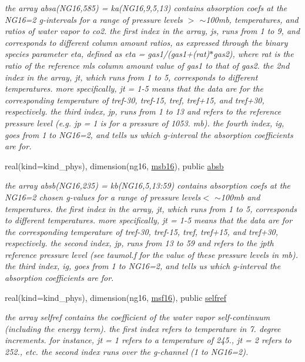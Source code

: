 \begin{Indent}
\begin{DoxyCompactItemize}
\begin{DoxyCompactList}\small\item\em the array absa(\+N\+G16,585) = ka(\+N\+G16,9,5,13) contains absorption coefs at the N\+G16=2 g-\/intervals for a range of pressure levels $>$ $\sim$100mb, temperatures, and ratios of water vapor to co2. the first index in the array, js, runs from 1 to 9, and corresponds to different column amount ratios, as expressed through the binary species parameter eta, defined as eta = gas1/(gas1+(rat)$\ast$gas2), where rat is the ratio of the reference mls column amount value of gas1 to that of gas2. the 2nd index in the array, jt, which runs from 1 to 5, corresponds to different temperatures. more specifically, jt = 1-\/5 means that the data are for the corresponding temperature of tref-\/30, tref-\/15, tref, tref+15, and tref+30, respectively. the third index, jp, runs from 1 to 13 and refers to the reference pressure level (e.\+g. jp = 1 is for a pressure of 1053. mb). the fourth index, ig, goes from 1 to N\+G16=2, and tells us which g-\/interval the absorption coefficients are for. \end{DoxyCompactList}\item 
real(kind=kind\+\_\+phys), dimension(ng16, \hyperlink{group__module__radlw__kgbnn_ga18ad5b461d6c71b1aa2d82d5694beb03}{msb16}), public \hyperlink{group__module__radlw__kgbnn_gae856b42252b71d4d588ea5e19e871cac}{absb}
\begin{DoxyCompactList}\small\item\em the array absb(\+N\+G16,235) = kb(\+N\+G16,5,13\+:59) contains absorption coefs at the N\+G16=2 chosen g-\/values for a range of pressure levels$<$ $\sim$100mb and temperatures. the first index in the array, jt, which runs from 1 to 5, corresponds to different temperatures. more specifically, jt = 1-\/5 means that the data are for the corresponding temperature of tref-\/30, tref-\/15, tref, tref+15, and tref+30, respectively. the second index, jp, runs from 13 to 59 and refers to the jpth reference pressure level (see taumol.\+f for the value of these pressure levels in mb). the third index, ig, goes from 1 to N\+G16=2, and tells us which g-\/interval the absorption coefficients are for. \end{DoxyCompactList}\item 
real(kind=kind\+\_\+phys), dimension(ng16, \hyperlink{group__module__radlw__kgbnn_ga8601911604c1d6a1b32e434159ae95d2}{msf16}), public \hyperlink{group__module__radlw__kgbnn_gafaa2554e1161bd6c983ce630d39d703a}{selfref}
\begin{DoxyCompactList}\small\item\em the array selfref contains the coefficient of the water vapor self-\/continuum (including the energy term). the first index refers to temperature in 7. degree increments. for instance, jt = 1 refers to a temperature of 245., jt = 2 refers to 252., etc. the second index runs over the g-\/channel (1 to N\+G16=2). \end{DoxyCompactList}\item 

\end{DoxyCompactItemize}
\end{Indent}
